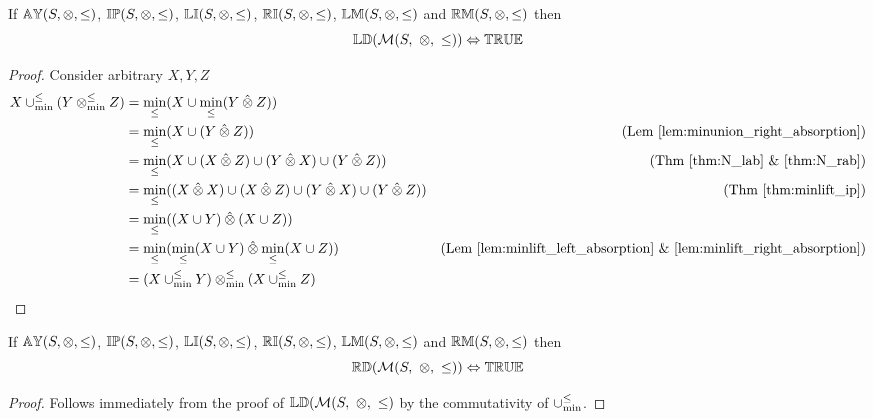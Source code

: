 
\begin{theorem} \label{thm:M_ld}
If ${\mathbb{AY}}(S,\otimes,\leq)$, ${\mathbb{IP}}(S,\otimes,\leq)$, ${\mathbb{LI}}(S,\otimes,\leq)$, ${\mathbb{RI}}(S,\otimes,\leq)$, ${\mathbb{LM}}(S,\otimes,\leq)$ and ${\mathbb{RM}}(S,\otimes,\leq)$ then
\begin{equation*}
\propname{LD}(\mathcal{M}(S,\ \otimes,\ \leq))  \Leftrightarrow \propname{TRUE}
\end{equation*}
\end{theorem}

\begin{proof}

\vspace{0.5em}
Consider arbitrary $X,Y,Z$
\begin{align*}
X \mathbin{\cup_{\min}^{\leq}} (Y \mathbin{\otimes_{\min}^{\leq}} Z) 	& = \min_\leq(X \cup \min_\leq(Y \mathbin{\hat{\otimes}} Z)) \\
							& = \min_\leq(X \cup (Y \mathbin{\hat{\otimes}} Z)) & \text{(Lem \ref{lem:minunion_right_absorption})} \\
							& = \min_\leq(X \cup (X \mathbin{\hat{\otimes}} Z) \cup (Y \mathbin{\hat{\otimes}} X) \cup (Y \mathbin{\hat{\otimes}} Z)) & \text{(Thm \ref{thm:N_lab} \& \ref{thm:N_rab})} \\
							& = \min_\leq((X \mathbin{\hat{\otimes}} X) \cup (X \mathbin{\hat{\otimes}} Z) \cup (Y \mathbin{\hat{\otimes}} X) \cup (Y \mathbin{\hat{\otimes}} Z)) & \text{(Thm \ref{thm:minlift_ip})} \\
							& = \min_\leq((X \cup Y) \mathbin{\hat{\otimes}} (X \cup Z)) \\
							& = \min_\leq(\min_\leq(X \cup Y) \mathbin{\hat{\otimes}} \min_\leq(X \cup Z)) & \text{(Lem \ref{lem:minlift_left_absorption} \& \ref{lem:minlift_right_absorption})} \\
							& = (X \mathbin{\cup_{\min}^{\leq}} Y) \mathbin{\otimes_{\min}^{\leq}} (X \mathbin{\cup_{\min}^{\leq}} Z)
\end{align*}
\end{proof}


\begin{theorem} \label{thm:M_rd}
If ${\mathbb{AY}}(S,\otimes,\leq)$, ${\mathbb{IP}}(S,\otimes,\leq)$, ${\mathbb{LI}}(S,\otimes,\leq)$, ${\mathbb{RI}}(S,\otimes,\leq)$, ${\mathbb{LM}}(S,\otimes,\leq)$ and ${\mathbb{RM}}(S,\otimes,\leq)$ then
\begin{equation*}
\propname{RD}(\mathcal{M}(S,\ \otimes,\ \leq))  \Leftrightarrow \propname{TRUE}
\end{equation*}
\end{theorem}

\begin{proof}

\vspace{0.5em}
Follows immediately from the proof of $\propname{LD}(\mathcal{M}(S,\ \otimes,\ \leq)$ by the commutativity of $\mathbin{\cup_{\min}^{\leq}}$.
\end{proof}


